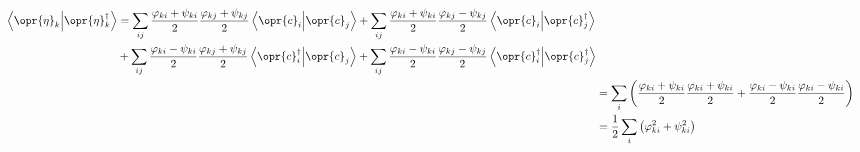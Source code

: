 \documentclass[../thesis.tex]{subfiles}
\begin{document}
\begin{align}
  \begin{split}
    \ip{\opr{\eta}_k}{\opr{\eta}_k^\dag}
  &=
  \sum_{ij}
  \frac{\varphi_{ki} + \psi_{ki}}{2}
  \frac{\varphi_{kj} + \psi_{kj}}{2}
  \ip{\opr{c}_i}{\opr{c}_j}
  +
  \sum_{ij}
  \frac{\varphi_{ki} + \psi_{ki}}{2}
  \frac{\varphi_{kj} - \psi_{kj}}{2}
  \ip{\opr{c}_i}{\opr{c}_j^\dag} \\
  &+
  \sum_{ij}
  \frac{\varphi_{ki} - \psi_{ki}}{2}
  \frac{\varphi_{kj} + \psi_{kj}}{2}
  \ip{\opr{c}_i^\dag}{\opr{c}_j}
  +
  \sum_{ij}
  \frac{\varphi_{ki} - \psi_{ki}}{2}
  \frac{\varphi_{kj} - \psi_{kj}}{2}
  \ip{\opr{c}_i^\dag}{\opr{c}_j^\dag}
  \end{split} \\
  &=
  \sum_i \qty(%
  \frac{\varphi_{ki} + \psi_{ki}}{2}
  \frac{\varphi_{ki} + \psi_{ki}}{2}
  +
  \frac{\varphi_{ki} - \psi_{ki}}{2}
  \frac{\varphi_{ki} - \psi_{ki}}{2}
  ) \\
  &=
  \frac{1}{2}
  \sum_i \qty(%
  \varphi_{ki}^2 + \psi_{ki}^2
  )
\end{align}
\end{document}
